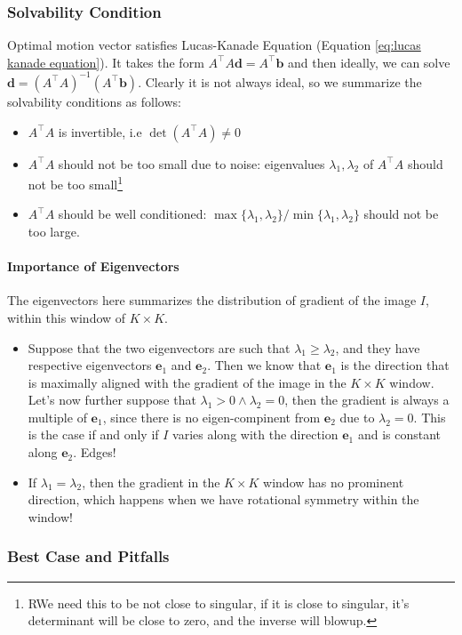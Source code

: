 \documentclass[11pt]{article}
\newcommand{\bb}{\mathbf{b}}
\newcommand{\bd}{\mathbf{d}}
\newcommand{\be}{\mathbf{e}}
\begin{document}
\subsubsection{Solvability Condition}
Optimal motion vector satisfies Lucas-Kanade Equation (Equation \ref{eq:lucas kanade equation}). It takes the form $A^\top A \bd = A^\top \bb$ and then ideally, we can solve $\bd = (A^\top A)^{-1} (A^\top \bb)$. Clearly it is not always ideal, so we summarize the solvability conditions as follows:
\begin{itemize}
	\item $A^\top A$ is invertible, i.e $\det (A^\top A) \neq 0$
	\item $A^\top A$ should not be too small due to noise: eigenvalues $\lambda_1, \lambda_2$ of $A^\top A$ should not be too small\footnote{RWe need this to be not close to singular, if it is close to singular, it's determinant will be close to zero, and the inverse will blowup. }
	\item $A^\top A$ should be well conditioned: $\max \{\lambda_1, \lambda_2\} / \min \{\lambda_1, \lambda_2 \}$ should not be too large. 
\end{itemize}

\paragraph{Importance of Eigenvectors} The eigenvectors here summarizes the distribution of gradient of the image $I$, within this window of $K \times K $. 
\begin{itemize}
	\item Suppose that the two eigenvectors are such that $\lambda_1 \geq \lambda_2$, and they have respective eigenvectors $\be_1$ and $\be_2$. Then we know that $\be_1$ is the direction that is maximally aligned with the gradient of the image in the $K \times K$ window. Let's now further suppose that $\lambda_1 > 0 \wedge \lambda_2 = 0$, then the gradient is always a multiple of $\be_1$, since there is no eigen-compinent from $\be_2$ due to $\lambda_2 = 0$. This is the case if and only if $I$ varies along with the direction $\be_1$ and is constant along $\be_2$. Edges!
	\item If $\lambda_1 = \lambda_2$, then the gradient in the $K \times K$ window has no prominent direction, which happens when we have rotational symmetry within the window!
\end{itemize}

\subsubsection{Best Case and Pitfalls}
\end{document}
